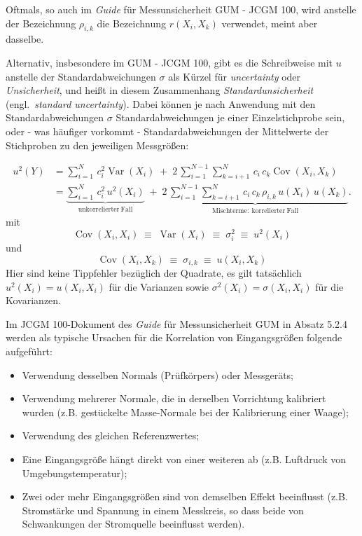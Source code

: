 Oftmals, so auch im \textsl{Guide} für Messunsicherheit GUM - JCGM 100, wird anstelle der
Bezeichnung $\rho_{i,k}$ die
Bezeichnung $r(X_{i},X_{k})$ verwendet, meint aber dasselbe.

Alternativ, insbesondere im GUM - JCGM 100, gibt es die Schreibweise mit $u$ anstelle der
Standardabweichungen $\sigma$ als Kürzel für \textsl{uncertainty} oder \textsl{Unsicherheit},
und heißt in diesem Zusammenhang \textsl{Standardunsicherheit} (engl.\ \textsl{standard uncertainty}).
Dabei können je nach Anwendung mit den Standardabweichungen $\sigma$ Standardabweichungen je einer
Einzelstichprobe sein, oder - was häufiger vorkommt - Standardabweichungen der Mittelwerte der Stichproben
zu den jeweiligen Messgrößen:

\begin{equation}
{\begin{aligned}
u^2(Y) & = \sum\limits_{i=1}^{N} \, c_i^2 \operatorname {Var}(X_{i}) \; + \; 2 \, \sum _{{i=1}}^{{N-1}}
  \sum\limits_{k=i+1}^{N} \, c_i \, c_k \operatorname {Cov}(X_{i},X_{k})\\
 & = \underbrace{\sum\limits_{i=1}^{N} \, c_i^2 \, u^2(X_i)}_{\mathrm{unkorrelierter~Fall}} \;  + \;
 \underbrace{2 \, \sum\limits_{i=1}^{{N-1}}
 \sum\limits_{k=i+1}^{N} \, c_i \, c_k \, \rho_{i,k} \, u(X_i) \, u(X_k)}_{\mathrm{Mischterme:~korrelierter~Fall}} .
\end{aligned}}
\label{UnsichFortpfl2}
\end{equation}
mit
\begin{equation}
\operatorname{Cov}(X_i, X_i) \; \equiv \; \operatorname{Var}(X_i)
\; \equiv \; \sigma^2_i \; \equiv \;  u^2(X_i)
\end{equation}
und
\begin{equation}
\operatorname{Cov}(X_i, X_k) \; \equiv \;
\sigma_{i,k} \; \equiv \; u(X_i,X_k)
\end{equation}
Hier sind keine Tippfehler bezüglich der Quadrate, es gilt tatsächlich $u^2(X_i) = u(X_i,X_i)$ für die Varianzen
sowie $\sigma^2(X_i) = \sigma(X_i,X_i)$ für die Kovarianzen.

Im JCGM 100-Dokument des \textsl{Guide} für Messunsicherheit GUM in Absatz 5.2.4
werden als typische Ursachen für die Korrelation von Eingangsgrößen  folgende aufgeführt:
\begin{itemize}
\item Verwendung desselben Normals (Prüfkörpers) oder Messgeräts;
\item Verwendung mehrerer Normale, die in derselben Vorrichtung kalibriert
wurden (z.B. gestückelte Masse-Normale bei der Kalibrierung einer Waage);
\item Verwendung des gleichen Referenzwertes;
\item Eine Eingangsgröße hängt direkt von einer weiteren ab
(z.B. Luftdruck von Um\-geb\-ungs\-tem\-pe\-ra\-tur);
\item Zwei oder mehr Eingangsgrößen sind von
demselben Effekt beeinflusst
(z.B. Stromstärke und Spannung in einem Messkreis, so dass beide
von Schwankungen der Stromquelle beeinflusst werden).
\end{itemize}

